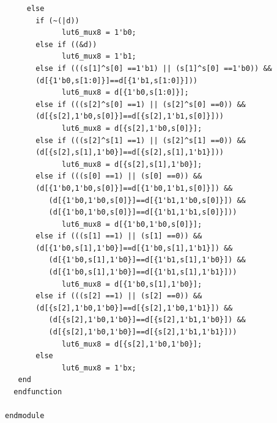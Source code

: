 \documentclass[a4paper,openright,12pt]{report}
\begin{document}
\begin{lstlisting}
     else
       if (~(|d))
             lut6_mux8 = 1'b0;
       else if ((&d))
             lut6_mux8 = 1'b1;
       else if (((s[1]^s[0] ==1'b1) || (s[1]^s[0] ==1'b0)) &&
       (d[{1'b0,s[1:0]}]==d[{1'b1,s[1:0]}]))
             lut6_mux8 = d[{1'b0,s[1:0]}];
       else if (((s[2]^s[0] ==1) || (s[2]^s[0] ==0)) && 
       (d[{s[2],1'b0,s[0]}]==d[{s[2],1'b1,s[0]}]))
             lut6_mux8 = d[{s[2],1'b0,s[0]}];
       else if (((s[2]^s[1] ==1) || (s[2]^s[1] ==0)) && 
       (d[{s[2],s[1],1'b0}]==d[{s[2],s[1],1'b1}]))
             lut6_mux8 = d[{s[2],s[1],1'b0}];
       else if (((s[0] ==1) || (s[0] ==0)) &&
       (d[{1'b0,1'b0,s[0]}]==d[{1'b0,1'b1,s[0]}]) &&
          (d[{1'b0,1'b0,s[0]}]==d[{1'b1,1'b0,s[0]}]) &&
          (d[{1'b0,1'b0,s[0]}]==d[{1'b1,1'b1,s[0]}]))
             lut6_mux8 = d[{1'b0,1'b0,s[0]}];
       else if (((s[1] ==1) || (s[1] ==0)) && 
       (d[{1'b0,s[1],1'b0}]==d[{1'b0,s[1],1'b1}]) &&
          (d[{1'b0,s[1],1'b0}]==d[{1'b1,s[1],1'b0}]) && 
          (d[{1'b0,s[1],1'b0}]==d[{1'b1,s[1],1'b1}]))
             lut6_mux8 = d[{1'b0,s[1],1'b0}];
       else if (((s[2] ==1) || (s[2] ==0)) &&
       (d[{s[2],1'b0,1'b0}]==d[{s[2],1'b0,1'b1}]) &&
          (d[{s[2],1'b0,1'b0}]==d[{s[2],1'b1,1'b0}]) && 
          (d[{s[2],1'b0,1'b0}]==d[{s[2],1'b1,1'b1}]))
             lut6_mux8 = d[{s[2],1'b0,1'b0}];
       else
             lut6_mux8 = 1'bx;
   end
  endfunction

endmodule
\end{lstlisting}
\end{document}
